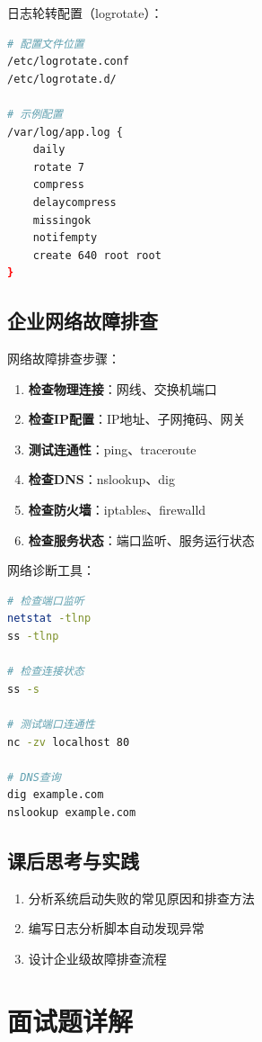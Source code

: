\documentclass[12pt,UTF8]{ctexbook}
\begin{document}
日志轮转配置（logrotate）：
\begin{lstlisting}[language=bash]
# 配置文件位置
/etc/logrotate.conf
/etc/logrotate.d/

# 示例配置
/var/log/app.log {
    daily
    rotate 7
    compress
    delaycompress
    missingok
    notifempty
    create 640 root root
}
\end{lstlisting}

\section{企业网络故障排查}
\label{sec:network-troubleshoot}

网络故障排查步骤：

\begin{enumerate}
    \item \textbf{检查物理连接}：网线、交换机端口
    \item \textbf{检查IP配置}：IP地址、子网掩码、网关
    \item \textbf{测试连通性}：ping、traceroute
    \item \textbf{检查DNS}：nslookup、dig
    \item \textbf{检查防火墙}：iptables、firewalld
    \item \textbf{检查服务状态}：端口监听、服务运行状态
\end{enumerate}

网络诊断工具：
\begin{lstlisting}[language=bash]
# 检查端口监听
netstat -tlnp
ss -tlnp

# 检查连接状态
ss -s

# 测试端口连通性
nc -zv localhost 80

# DNS查询
dig example.com
nslookup example.com
\end{lstlisting}

\section{课后思考与实践}
\label{sec:troubleshoot-practice}
\begin{enumerate}
    \item 分析系统启动失败的常见原因和排查方法
    \item 编写日志分析脚本自动发现异常
    \item 设计企业级故障排查流程
\end{enumerate}

\chapter{面试题详解}
\label{chap:interview}
\end{document}
